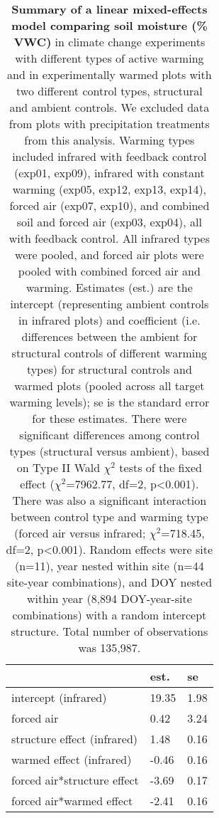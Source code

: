 \documentclass{article}
\begin{document}
\begin{table}[ht]
\centering
\caption{\textbf{Summary of a linear mixed-effects model comparing soil moisture (\% VWC)} in climate change experiments with different types of active warming and in experimentally warmed plots with two different control types, structural and ambient controls. We excluded data from plots with precipitation treatments from this analysis. Warming types included infrared with feedback control (exp01, exp09), infrared with constant warming (exp05, exp12, exp13, exp14), forced air (exp07, exp10), and combined soil and forced air (exp03, exp04), all with feedback control.  All infrared types were pooled, and forced air plots were pooled with combined forced air and warming.  Estimates (est.) are the intercept (representing ambient controls in infrared plots) and coefficient (i.e. differences between the ambient for structural controls of different warming types) for structural controls and warmed plots (pooled across all target warming levels); se is the standard error for these estimates. There were significant differences among control types (structural versus ambient), based on Type II Wald $\chi^{2}$ tests of the fixed effect ($\chi^{2}$=7962.77, df=2, p<0.001). There was also a significant interaction between control type and warming type (forced air versus infrared; $\chi^{2}$=718.45, df=2, p<0.001). Random effects were site (n=11), year nested within site (n=44 site-year combinations), and DOY nested within year (8,894 DOY-year-site combinations) with a random intercept structure. Total number of observations was 135,987.} 
\label{table:warmsoilmois}
\begingroup\footnotesize
\begin{tabular}{|p{}|p{}p{}|}
  \hline
 & est. & se \\ 
  \hline
intercept (infrared) & 19.35 & 1.98 \\ 
  forced air & 0.42 & 3.24 \\ 
  structure effect (infrared) & 1.48 & 0.16 \\ 
  warmed effect (infrared) & -0.46 & 0.16 \\ 
  forced air*structure effect & -3.69 & 0.17 \\ 
  forced air*warmed effect & -2.41 & 0.16 \\ 
   \hline
\end{tabular}
\endgroup
\end{table}%
\end{document}
